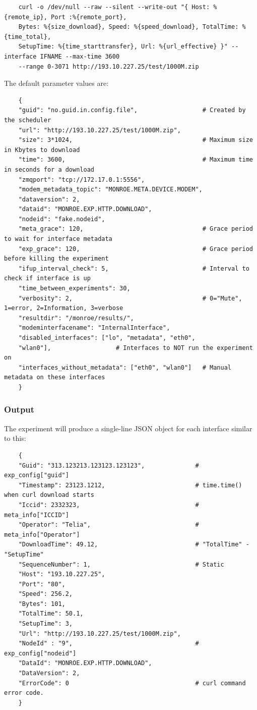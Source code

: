 \documentclass[a4paper,10pt]{article}
\newcommand{\VerbatimFont}{\footnotesize}
\begin{document}
{\VerbatimFont
	\begin{verbatim}
	curl -o /dev/null --raw --silent --write-out "{ Host: %{remote_ip}, Port :%{remote_port},
	Bytes: %{size_download}, Speed: %{speed_download}, TotalTime: %{time_total},
	SetupTime: %{time_starttransfer}, Url: %{url_effective} }" --interface IFNAME --max-time 3600
	--range 0-3071 http://193.10.227.25/test/1000M.zip
	\end{verbatim}}

The default parameter values are:

{\VerbatimFont
	\begin{verbatim}
	{
	"guid": "no.guid.in.config.file",                  # Created by the scheduler
	"url": "http://193.10.227.25/test/1000M.zip",
	"size": 3*1024,                                    # Maximum size in Kbytes to download
	"time": 3600,                                      # Maximum time in seconds for a download
	"zmqport": "tcp://172.17.0.1:5556",
	"modem_metadata_topic": "MONROE.META.DEVICE.MODEM",
	"dataversion": 2,
	"dataid": "MONROE.EXP.HTTP.DOWNLOAD",
	"nodeid": "fake.nodeid",
	"meta_grace": 120,                                 # Grace period to wait for interface metadata
	"exp_grace": 120,                                  # Grace period before killing the experiment
	"ifup_interval_check": 5,                          # Interval to check if interface is up
	"time_between_experiments": 30,
	"verbosity": 2,                                    # 0="Mute", 1=error, 2=Information, 3=verbose
	"resultdir": "/monroe/results/",
	"modeminterfacename": "InternalInterface",
	"disabled_interfaces": ["lo", "metadata", "eth0",
	"wlan0"],                  # Interfaces to NOT run the experiment on
	"interfaces_without_metadata": ["eth0", "wlan0"]   # Manual metadata on these interfaces
	}
	\end{verbatim}}

\subsubsection{Output}

The experiment will produce a single-line JSON object for each interface similar to this:

{\VerbatimFont
	\begin{verbatim}
	{
	"Guid": "313.123213.123123.123123",              # exp_config["guid"]
	"Timestamp": 23123.1212,                         # time.time() when curl download starts
	"Iccid": 2332323,                                # meta_info["ICCID"]
	"Operator": "Telia",                             # meta_info["Operator"]
	"DownloadTime": 49.12,                           # "TotalTime" - "SetupTime"
	"SequenceNumber": 1,                             # Static 
	"Host": "193.10.227.25",
	"Port": "80",
	"Speed": 256.2,
	"Bytes": 101,
	"TotalTime": 50.1,
	"SetupTime": 3, 
	"Url": "http://193.10.227.25/test/1000M.zip",
	"NodeId" : "9",                                  # exp_config["nodeid"]
	"DataId": "MONROE.EXP.HTTP.DOWNLOAD",
	"DataVersion": 2,
	"ErrorCode": 0                                   # curl command error code.
	}
	\end{verbatim}}
\end{document}
